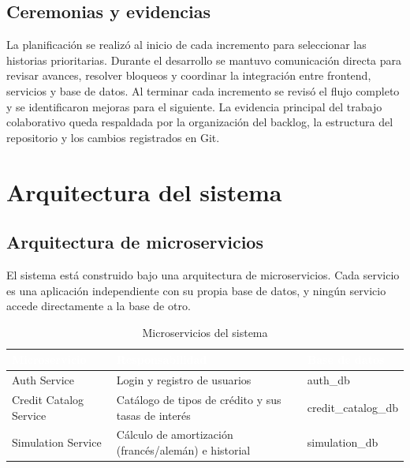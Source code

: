 \documentclass[12pt,a4paper]{article}
\begin{document}
\subsection{Ceremonias y evidencias}

La planificación se realizó al inicio de cada incremento para seleccionar las
historias prioritarias. Durante el desarrollo se mantuvo comunicación directa
para revisar avances, resolver bloqueos y coordinar la integración entre
frontend, servicios y base de datos. Al terminar cada incremento se revisó el
flujo completo y se identificaron mejoras para el siguiente. La evidencia
principal del trabajo colaborativo queda respaldada por la organización del
backlog, la estructura del repositorio y los cambios registrados en Git.

\section{Arquitectura del sistema}

\subsection{Arquitectura de microservicios}

El sistema está construido bajo una arquitectura de microservicios. Cada servicio es una aplicación independiente con su propia base de datos, y ningún servicio accede directamente a la base de otro.

\begin{table}[H]
\centering
\caption{Microservicios del sistema}
\begin{tabularx}{\textwidth}{>{\raggedright\arraybackslash}p{4cm} X >{\raggedright\arraybackslash}p{3.5cm}}
\toprule
\rowcolor{azulUTA}
\textcolor{white}{\textbf{Microservicio}} & \textcolor{white}{\textbf{Responsabilidad}} & \textcolor{white}{\textbf{Base de datos}} \\
\midrule
Auth Service & Login y registro de usuarios & auth\_db \\
Credit Catalog Service & Catálogo de tipos de crédito y sus tasas de interés & credit\_catalog\_db \\
Simulation Service & Cálculo de amortización (francés/alemán) e historial & simulation\_db \\
\bottomrule
\end{tabularx}
\end{table}
\end{document}
